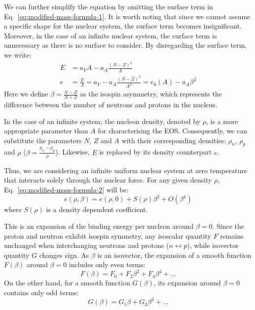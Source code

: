 We can further simplify the equation by omitting the surface term in Eq.~\ref{eq:modified-mass-formula-1}. 
It is worth noting that since we cannot assume a specific shape for the nuclear system, 
the surface term becomes insignificant. Moreover, in the case of an infinite nuclear system, 
the surface term is unnecessary as there is no surface to consider. 
By disregarding the surface term, we write:
\begin{equation}
    \begin{aligned}
	E &= a_V A - a_A\frac{(N-Z)^2}{A}  \\
	e &= \frac{E}{A} = a_V - a_A\frac{(N-Z)^2}{A^2} = e_0(A) - a_A\beta^2 
    \end{aligned}
    \label{eq:modified-mass-formula-2}
\end{equation}
Here we define $\beta = \frac{N-Z}{N+Z}$ as the isospin asymmetry, which represents 
the difference between the number of neutrons and protons in the nucleus.

In the case of an infinite system, the nucleon density, denoted by $\rho$, is a
more appropriate parameter than $A$ for characterising the EOS. Consequently, 
we can substitute the parameters $N$, $Z$ and $A$ with their corresponding densities: 
$\rho_n$, $\rho_p$ and $\rho$ ($\beta = \frac{\rho_n - \rho_p}{\rho}$). 
Likewise, $E$ is replaced by its density counterpart $e$.

Thus, we are considering an infinite uniform nuclear system at zero temperature that interacts
solely through the nuclear force. For any given density $\rho$,
Eq.~\ref{eq:modified-mass-formula-2} will be:
\begin{equation}
    e(\rho, \beta) = e(\rho, 0) + S(\rho)\beta^2 + O(\beta^4)
    \label{eq:symmetry-energy}
\end{equation}
where $S(\rho)$ is a density dependent coefficient.

This is an expansion of the binding energy per nucleon around $\beta = 0$.
Since the proton and neutron exhibit isospin symmetry, any isoscalar quantity
$F$ remains unchanged when interchanging neutrons and protons ($n \leftrightarrow p$), 
while isovector quantity $G$ changes sign. As $\beta$ is an isovector, the expansion
of a smooth function $F(\beta)$ around $\beta = 0$ includes only even terms:
$$ F(\beta) = F_0 + F_2\beta^2 + F_4\beta^4 + \dots $$
On the other hand, for a smooth function $G(\beta)$, its expansion around $\beta = 0$ 
contains only odd terms:
$$ G(\beta) = G_1\beta + G_3\beta^3 + \dots $$

